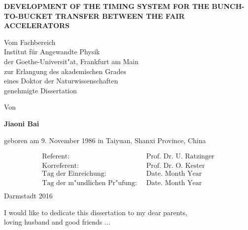 \documentclass[12pt,twoside]{report}
\begin{document}
\begin{center}
\thispagestyle{empty}

    \vspace{6cm}
	 \LARGE \textbf{\uppercase{Development of the timing system for the Bunch-to-Bucket transfer between the FAIR accelerators }}
	 \vspace{2cm}

	{ \normalsize Vom Fachbereich\\
	Institut für Angewandte Physik\\
	der Goethe-Universit"at, Frankfurt am Main\\
	zur Erlangung des akademischen Grades\\
	eines Doktor der Naturwissenschaften\\
	genehmigte Dissertation\par}
    \vspace{2cm}
    {\normalsize Von \par}
    \LARGE \textbf{ Jiaoni Bai}\\
    {\normalsize geboren am 9. November 1986 in Taiyuan, Shanxi Province, China \par}
    \vspace{2cm}
	\normalsize
	\begin{align*}
		 \text{Referent: }\:  &\text{Prof. Dr. U. Ratzinger}\\
		 \text{Korreferent: }\: &\text{Prof. Dr. O. Kester}\\
		 \text{Tag der Einreichung: }\: &\text{Date. Month Year}\\
		 \text{Tag der m"undlichen Pr"ufung: }\: &\text{Date. Month Year} \\
\end{align*}
    \vspace{2cm}
    {\normalsize Darmstadt 2016}
\end{center}

\renewcommand{\labelitemii}{$\bullet$}

\clearpage
\vspace*{\fill}
\begin{center}
\begin{minipage}{.8\textwidth}
I would like to dedicate this dissertation to my dear parents,\\ loving husband and good friends ...
\end{minipage}
\end{center}
\vfill %
\clearpage
\end{document}
